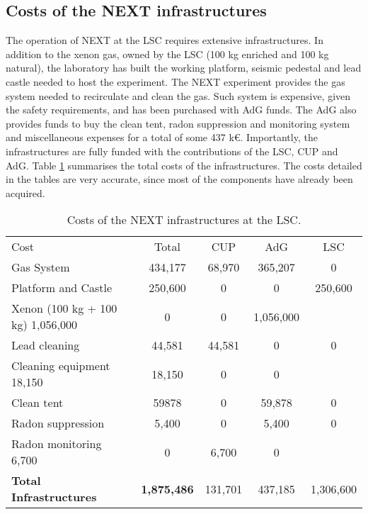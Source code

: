 \subsection{Costs of the NEXT infrastructures}
The operation of NEXT at the LSC requires extensive infrastructures. In addition to the xenon gas, owned by the LSC (100 kg enriched and 100 kg natural), the laboratory has built the working platform, seismic pedestal and lead castle needed to host the experiment. The NEXT experiment provides the gas system needed to recirculate and clean the gas. Such system is expensive, given the safety requirements, and has been purchased with AdG funds. The AdG also provides funds to buy the clean tent, radon suppression and monitoring system and miscellaneous expenses for a total of some
437 k\euro. Importantly, the infrastructures are fully funded with the contributions of the LSC, CUP and AdG. 
Table \ref{tab.n100:INFRA} summarises the total costs of the infrastructures. The costs detailed in the tables are very accurate, since most of the components have already been acquired. 


  
\begin{table}[h!]
\begin{center}
\begin{tabular}{|l|c|c|c|c|}
\hline
 Cost &	Total& 	CUP & AdG &  LSC \\
Gas System &	434,177 &	68,970 &	365,207 &	0 \\
Platform and Castle	& 250,600 & 	0	&0 &	250,600 \\
Xenon (100 kg + 100 kg)	1,056,000	& 0 & 0 &	1,056,000 \\
Lead cleaning	& 44,581 &44,581 &	0 & 0 \\
Cleaning equipment	18,150	& 18,150	& 0	& 0	\\
Clean tent	 & 59878	&	0& 59,878 &	0	\\
Radon suppression 	& 5,400 &	0 &	5,400 &	0	\\
Radon monitoring	6,700 &	0	& 6,700	& 0	\\
 \hline
{\bf Total Infrastructures} &	{\bf1,875,486}& 131,701& 437,185 & 1,306,600 \\	
 \hline\hline
\end{tabular}  
\caption{Costs of the NEXT infrastructures at the LSC.}
\label{tab.n100:INFRA}
\end{center}
\end{table} 

